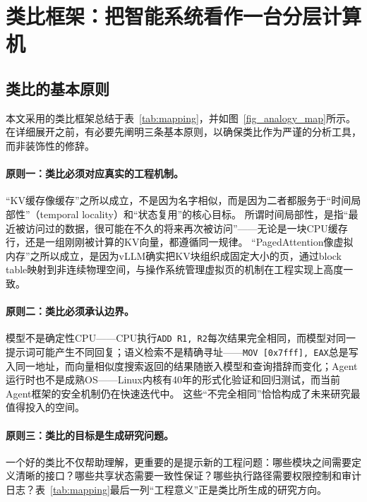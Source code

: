 \section{类比框架：把智能系统看作一台分层计算机}
\label{sec:framework}

\subsection{类比的基本原则}

本文采用的类比框架总结于表~\ref{tab:mapping}，并如图~\ref{fig_analogy_map}所示。
在详细展开之前，有必要先阐明三条基本原则，以确保类比作为严谨的分析工具，而非装饰性的修辞。

\paragraph{原则一：类比必须对应真实的工程机制。}
``KV缓存像缓存''之所以成立，不是因为名字相似，而是因为二者都服务于``时间局部性''（temporal locality）和``状态复用''的核心目标\cite{drepper2007memory,kwon2023pagedattention}。
所谓时间局部性，是指``最近被访问过的数据，很可能在不久的将来再次被访问''——无论是一块CPU缓存行，还是一组刚刚被计算的KV向量，都遵循同一规律。
``PagedAttention像虚拟内存''之所以成立，是因为vLLM确实把KV块组织成固定大小的页，通过block table映射到非连续物理空间，与操作系统管理虚拟页的机制在工程实现上高度一致\cite{kwon2023pagedattention}。

\paragraph{原则二：类比必须承认边界。}
模型不是确定性CPU——CPU执行\texttt{ADD R1, R2}每次结果完全相同，而模型对同一提示词可能产生不同回复；语义检索不是精确寻址——\texttt{MOV [0x7fff], EAX}总是写入同一地址，而向量相似度搜索返回的结果随嵌入模型和查询措辞而变化；Agent运行时也不是成熟OS——Linux内核有40年的形式化验证和回归测试，而当前Agent框架的安全机制仍在快速迭代中。
这些``不完全相同''恰恰构成了未来研究最值得投入的空间。

\paragraph{原则三：类比的目标是生成研究问题。}
一个好的类比不仅帮助理解，更重要的是提示新的工程问题：哪些模块之间需要定义清晰的接口？哪些共享状态需要一致性保证？哪些执行路径需要权限控制和审计日志？表~\ref{tab:mapping}最后一列``工程意义''正是类比所生成的研究方向。

